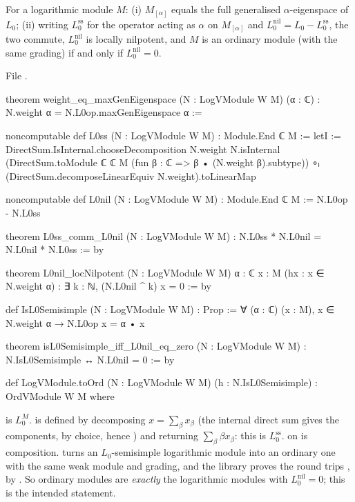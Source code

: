 \begin{theorem}\label{l12:thm:loggrading}
For a logarithmic module $M$: (i) $M_{[\alpha]}$ equals the full generalised $\alpha$-eigenspace of $L_0$;
(ii) writing $L_0^{\mathrm{ss}}$ for the operator acting as $\alpha$ on $M_{[\alpha]}$ and
$L_0^{\mathrm{nil}} = L_0 - L_0^{\mathrm{ss}}$, the two commute, $L_0^{\mathrm{nil}}$ is locally nilpotent,
and $M$ is an ordinary module (with the same grading) if and only if $L_0^{\mathrm{nil}} = 0$.
\end{theorem}
\noindent File .
\begin{leancode}
theorem weight_eq_maxGenEigenspace (N : LogVModule W M) (α : ℂ) :
    N.weight α = N.L0op.maxGenEigenspace α :=

noncomputable def L0ss (N : LogVModule W M) : Module.End ℂ M :=
  letI := DirectSum.IsInternal.chooseDecomposition N.weight N.isInternal
  (DirectSum.toModule ℂ ℂ M (fun β : ℂ => β • (N.weight β).subtype)) ∘ₗ
    (DirectSum.decomposeLinearEquiv N.weight).toLinearMap

noncomputable def L0nil (N : LogVModule W M) : Module.End ℂ M := N.L0op - N.L0ss

theorem L0ss_comm_L0nil (N : LogVModule W M) : N.L0ss * N.L0nil = N.L0nil * N.L0ss := by

theorem L0nil_locNilpotent (N : LogVModule W M) {α : ℂ} {x : M} (hx : x ∈ N.weight α) :
    ∃ k : ℕ, (N.L0nil ^ k) x = 0 := by

def IsL0Semisimple (N : LogVModule W M) : Prop :=
  ∀ (α : ℂ) (x : M), x ∈ N.weight α → N.L0op x = α • x

theorem isL0Semisimple_iff_L0nil_eq_zero (N : LogVModule W M) :
    N.IsL0Semisimple ↔ N.L0nil = 0 := by

def LogVModule.toOrd (N : LogVModule W M) (h : N.IsL0Semisimple) : OrdVModule W M where
\end{leancode}

\begin{dictionary}
 is $L_0^M$.  is defined by decomposing $x = \sum_\beta x_\beta$ (the internal direct
sum gives the components, by choice, hence ) and returning $\sum_\beta\beta x_\beta$: this
is $L_0^{\mathrm{ss}}$. \lean{*} on  is composition.  turns an
$L_0$-semisimple logarithmic module into an ordinary one with the same weak module and grading, and the
library proves the round trips ,  by . So ordinary modules
are \emph{exactly} the logarithmic modules with $L_0^{\mathrm{nil}} = 0$; this is the intended
statement.
\end{dictionary}

